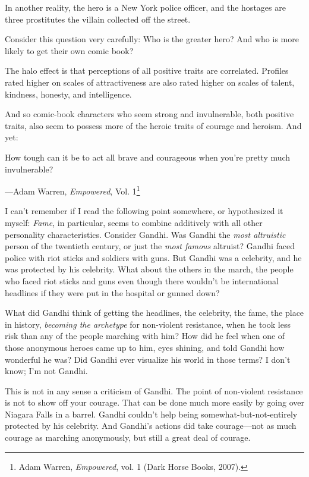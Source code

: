 {
 In another reality, the hero is a New York police officer, and the
hostages are three prostitutes the villain collected off the street.}

{
 Consider this question very carefully: Who is the greater hero?
And who is more likely to get their own comic book?}

{
 The halo effect is that perceptions of all positive traits are
correlated. Profiles rated higher on scales of attractiveness are also
rated higher on scales of talent, kindness, honesty, and intelligence.}

{
 And so comic-book characters who seem strong and invulnerable,
both positive traits, also seem to possess more of the heroic traits of
courage and heroism. And yet:}

{
 How tough can it be to act all brave and courageous when
you're pretty much invulnerable?}

{\raggedleft
 {}---Adam Warren, \textit{Empowered}, Vol. 1\footnote{Adam Warren, \textit{Empowered}, vol. 1 (Dark Horse Books,
2007).}
\par}


\bigskip

{
 I can't remember if I read the following point
somewhere, or hypothesized it myself: \textit{Fame}, in particular,
seems to combine additively with all other personality characteristics.
Consider Gandhi. Was Gandhi the \textit{most altruistic} person of the
twentieth century, or just the \textit{most famous} altruist? Gandhi
faced police with riot sticks and soldiers with guns. But Gandhi was a
celebrity, and he was protected by his celebrity. What about the others
in the march, the people who faced riot sticks and guns even though
there wouldn't be international headlines if they were
put in the hospital or gunned down?}

{
 What did Gandhi think of getting the headlines, the celebrity, the
fame, the place in history, \textit{becoming the archetype} for
non-violent resistance, when he took less risk than any of the people
marching with him? How did he feel when one of those anonymous heroes
came up to him, eyes shining, and told Gandhi how wonderful he was? Did
Gandhi ever visualize his world in those terms? I don't
know; I'm not Gandhi.}

{
 This is not in any sense a criticism of Gandhi. The point of
non-violent resistance is not to show off your courage. That can be
done much more easily by going over Niagara Falls in a barrel. Gandhi
couldn't help being somewhat-but-not-entirely protected
by his celebrity. And Gandhi's actions did take
courage---not as much courage as marching anonymously, but still a
great deal of courage.}

